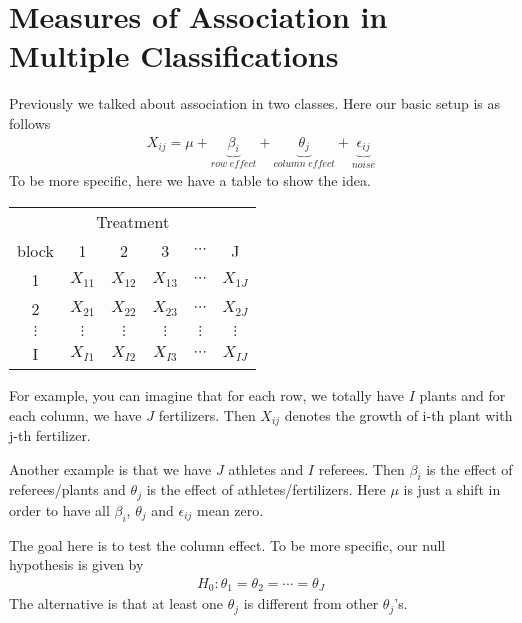 \documentclass[twoside]{article}
\begin{document}
	\section{Measures of Association in Multiple Classifications}
	Previously we talked about association in two classes. Here our basic setup is as follows
	\begin{align*}
		X_{ij} = \mu + \underbrace{\beta_i}_{row \; effect} + \underbrace{\theta_j}_{column \; effect} + \underbrace{\epsilon_{ij}}_{noise}
	\end{align*}
	To be more specific, here we have a table to show the idea. 
	\begin{center}
		\begin{tabular}{c|c|c|c|c|c}
			\multicolumn{6}{c}{Treatment}\\
			block & 1 & 2 & 3 & $\cdots$ & J\\
			\hline
			1 & $X_{11}$ & $X_{12}$ & $X_{13}$ & $\cdots$ & $X_{1J}$\\
			\hline
			2 & $X_{21}$ & $X_{22}$ & $X_{23}$ & $\cdots$ & $X_{2J}$\\
			\hline
			$\vdots$ & $\vdots$ & $\vdots$ & $\vdots$ & $\vdots$ & $\vdots$\\
			\hline
			I & $X_{I1}$ & $X_{I2}$ & $X_{I3}$ & $\cdots$ & $X_{IJ}$\\
		\end{tabular}
	\end{center}
	For example, you can imagine that for each row, we totally have $I$ plants and for each column, we have $J$ fertilizers. Then $X_{ij}$ denotes the growth of i-th plant with j-th fertilizer. 
	
	Another example is that we have $J$ athletes and $I$ referees. Then $\beta_i$ is the effect of referees/plants and $\theta_j$ is the effect of athletes/fertilizers. Here $\mu$ is just a shift in order to have all $\beta_i$, $\theta_j$ and $\epsilon_{ij}$ mean zero. 
	
	The goal here is to test the column effect. To be more specific, our null hypothesis is given by
	\begin{align*}
		H_0: \theta_1 = \theta_2 = \cdots = \theta_J
	\end{align*}
	The alternative is that at least one $\theta_j$ is different from other $\theta_j$'s. 
	
	
\end{document}
